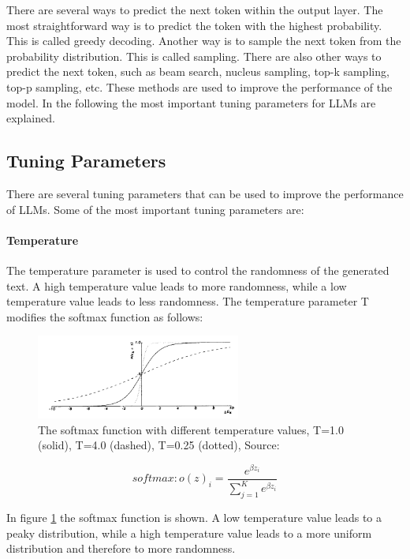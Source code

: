 There are several ways to predict the next token within the output layer. The most straightforward way is to predict the token with the highest probability. This is called greedy decoding. Another way is to sample the next token from the probability distribution. This is called sampling. There are also other ways to predict the next token, such as beam search, nucleus sampling, top-k sampling, top-p sampling, etc. These methods are used to improve the performance of the model. In the following the most important tuning parameters for LLMs are explained.

\subsection{Tuning Parameters}

There are several tuning parameters that can be used to improve the performance of LLMs. Some of the most important tuning parameters are:

\paragraph{Temperature}
The temperature parameter is used to control the randomness of the generated text. A high temperature value leads to more randomness, while a low temperature value leads to less randomness. The temperature parameter T modifies the softmax function as follows:

\begin{figure}[h!]
    \centering
    \includegraphics[width=0.6\textwidth]{images/temperature.png}
    \caption{The softmax function with different temperature values, T=1.0 (solid), T=4.0 (dashed), T=0.25 (dotted), Source: \citet{ACKLEY.1985}}
    \label{fig:temperature}
\end{figure}

$$softmax: o(z)_i = \frac{e^{\beta z_i}}{\sum_{j=1}^K e^{\beta z_i}}$$

In figure \ref{fig:temperature} the softmax function is shown. A low temperature value leads to a peaky distribution, while a high temperature value leads to a more uniform distribution and therefore to more randomness.


